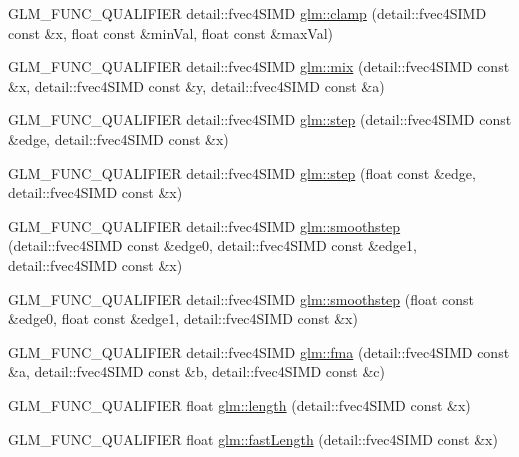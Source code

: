 \begin{DoxyCompactItemize}
\item 
G\+L\+M\+\_\+\+F\+U\+N\+C\+\_\+\+Q\+U\+A\+L\+I\+F\+I\+E\+R detail\+::fvec4\+S\+I\+M\+D \hyperlink{namespaceglm_ae7db62bebbc1cdea7444d6f89313af2f}{glm\+::clamp} (detail\+::fvec4\+S\+I\+M\+D const \&x, float const \&min\+Val, float const \&max\+Val)
\item 
G\+L\+M\+\_\+\+F\+U\+N\+C\+\_\+\+Q\+U\+A\+L\+I\+F\+I\+E\+R detail\+::fvec4\+S\+I\+M\+D \hyperlink{namespaceglm_a4b388e53d27196411517929d6ee91867}{glm\+::mix} (detail\+::fvec4\+S\+I\+M\+D const \&x, detail\+::fvec4\+S\+I\+M\+D const \&y, detail\+::fvec4\+S\+I\+M\+D const \&a)
\item 
G\+L\+M\+\_\+\+F\+U\+N\+C\+\_\+\+Q\+U\+A\+L\+I\+F\+I\+E\+R detail\+::fvec4\+S\+I\+M\+D \hyperlink{namespaceglm_a0af681288eaacb38ded2a597bc7fd214}{glm\+::step} (detail\+::fvec4\+S\+I\+M\+D const \&edge, detail\+::fvec4\+S\+I\+M\+D const \&x)
\item 
G\+L\+M\+\_\+\+F\+U\+N\+C\+\_\+\+Q\+U\+A\+L\+I\+F\+I\+E\+R detail\+::fvec4\+S\+I\+M\+D \hyperlink{namespaceglm_ac7e3b091e30c01352c8349c656d52a9f}{glm\+::step} (float const \&edge, detail\+::fvec4\+S\+I\+M\+D const \&x)
\item 
G\+L\+M\+\_\+\+F\+U\+N\+C\+\_\+\+Q\+U\+A\+L\+I\+F\+I\+E\+R detail\+::fvec4\+S\+I\+M\+D \hyperlink{namespaceglm_acaa3fe01372937d4ee7739ad87db0f15}{glm\+::smoothstep} (detail\+::fvec4\+S\+I\+M\+D const \&edge0, detail\+::fvec4\+S\+I\+M\+D const \&edge1, detail\+::fvec4\+S\+I\+M\+D const \&x)
\item 
G\+L\+M\+\_\+\+F\+U\+N\+C\+\_\+\+Q\+U\+A\+L\+I\+F\+I\+E\+R detail\+::fvec4\+S\+I\+M\+D \hyperlink{namespaceglm_a38415c03c75a84267151b370d866e42e}{glm\+::smoothstep} (float const \&edge0, float const \&edge1, detail\+::fvec4\+S\+I\+M\+D const \&x)
\item 
G\+L\+M\+\_\+\+F\+U\+N\+C\+\_\+\+Q\+U\+A\+L\+I\+F\+I\+E\+R detail\+::fvec4\+S\+I\+M\+D \hyperlink{namespaceglm_a3dd47df42a32adc14c604bed47633830}{glm\+::fma} (detail\+::fvec4\+S\+I\+M\+D const \&a, detail\+::fvec4\+S\+I\+M\+D const \&b, detail\+::fvec4\+S\+I\+M\+D const \&c)
\item 
G\+L\+M\+\_\+\+F\+U\+N\+C\+\_\+\+Q\+U\+A\+L\+I\+F\+I\+E\+R float \hyperlink{namespaceglm_a65aff7dc68102a01ec2746d2c0c733c7}{glm\+::length} (detail\+::fvec4\+S\+I\+M\+D const \&x)
\item 
G\+L\+M\+\_\+\+F\+U\+N\+C\+\_\+\+Q\+U\+A\+L\+I\+F\+I\+E\+R float \hyperlink{namespaceglm_ae8fababc16f402b8e518982eb08284ef}{glm\+::fast\+Length} (detail\+::fvec4\+S\+I\+M\+D const \&x)
\item 

\end{DoxyCompactItemize}
